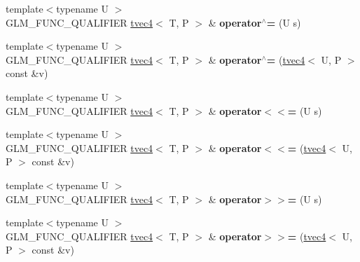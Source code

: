\begin{DoxyCompactItemize}
\item 
\hypertarget{structglm_1_1detail_1_1tvec4_a3c211495ff2065e67eec3738f67395ff}{{\footnotesize template$<$typename U $>$ }\\G\-L\-M\-\_\-\-F\-U\-N\-C\-\_\-\-Q\-U\-A\-L\-I\-F\-I\-E\-R \hyperlink{structglm_1_1detail_1_1tvec4}{tvec4}$<$ T, P $>$ \& {\bfseries operator$^\wedge$=} (U s)}\label{structglm_1_1detail_1_1tvec4_a3c211495ff2065e67eec3738f67395ff}

\item 
\hypertarget{structglm_1_1detail_1_1tvec4_af96b8c8c3da7f1d716d6b95c77170172}{{\footnotesize template$<$typename U $>$ }\\G\-L\-M\-\_\-\-F\-U\-N\-C\-\_\-\-Q\-U\-A\-L\-I\-F\-I\-E\-R \hyperlink{structglm_1_1detail_1_1tvec4}{tvec4}$<$ T, P $>$ \& {\bfseries operator$^\wedge$=} (\hyperlink{structglm_1_1detail_1_1tvec4}{tvec4}$<$ U, P $>$ const \&v)}\label{structglm_1_1detail_1_1tvec4_af96b8c8c3da7f1d716d6b95c77170172}

\item 
\hypertarget{structglm_1_1detail_1_1tvec4_a08906968ad1d2a2e5b467e140f7a5550}{{\footnotesize template$<$typename U $>$ }\\G\-L\-M\-\_\-\-F\-U\-N\-C\-\_\-\-Q\-U\-A\-L\-I\-F\-I\-E\-R \hyperlink{structglm_1_1detail_1_1tvec4}{tvec4}$<$ T, P $>$ \& {\bfseries operator$<$$<$=} (U s)}\label{structglm_1_1detail_1_1tvec4_a08906968ad1d2a2e5b467e140f7a5550}

\item 
\hypertarget{structglm_1_1detail_1_1tvec4_a22bfc21e16155253755657844ca76d36}{{\footnotesize template$<$typename U $>$ }\\G\-L\-M\-\_\-\-F\-U\-N\-C\-\_\-\-Q\-U\-A\-L\-I\-F\-I\-E\-R \hyperlink{structglm_1_1detail_1_1tvec4}{tvec4}$<$ T, P $>$ \& {\bfseries operator$<$$<$=} (\hyperlink{structglm_1_1detail_1_1tvec4}{tvec4}$<$ U, P $>$ const \&v)}\label{structglm_1_1detail_1_1tvec4_a22bfc21e16155253755657844ca76d36}

\item 
\hypertarget{structglm_1_1detail_1_1tvec4_a7fe7eefe66d5c896d21c32a4ec597cae}{{\footnotesize template$<$typename U $>$ }\\G\-L\-M\-\_\-\-F\-U\-N\-C\-\_\-\-Q\-U\-A\-L\-I\-F\-I\-E\-R \hyperlink{structglm_1_1detail_1_1tvec4}{tvec4}$<$ T, P $>$ \& {\bfseries operator$>$$>$=} (U s)}\label{structglm_1_1detail_1_1tvec4_a7fe7eefe66d5c896d21c32a4ec597cae}

\item 
\hypertarget{structglm_1_1detail_1_1tvec4_a080d672296e86beecd2d91b75bc0e843}{{\footnotesize template$<$typename U $>$ }\\G\-L\-M\-\_\-\-F\-U\-N\-C\-\_\-\-Q\-U\-A\-L\-I\-F\-I\-E\-R \hyperlink{structglm_1_1detail_1_1tvec4}{tvec4}$<$ T, P $>$ \& {\bfseries operator$>$$>$=} (\hyperlink{structglm_1_1detail_1_1tvec4}{tvec4}$<$ U, P $>$ const \&v)}\label{structglm_1_1detail_1_1tvec4_a080d672296e86beecd2d91b75bc0e843}

\end{DoxyCompactItemize}
